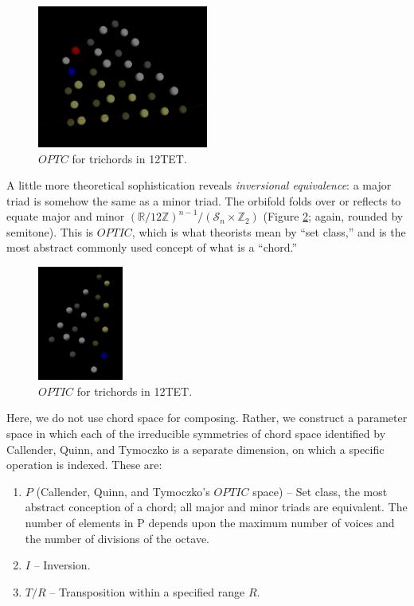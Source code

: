\documentclass[english,11pt,letterpaper,onecolumn]{scrartcl}
\numberwithin{equation}{section}
\begin{document}
\begin{figure}
\centerline{\includegraphics[width = 0.5\textwidth]{opttc}}
\caption{\label{fig:opttc}
  $OPTC$ for trichords in 12TET.}
\end{figure}

A little more theoretical sophistication reveals \textit{inversional
equivalence}: a major triad is somehow the same as a minor triad. The orbifold
folds over or reflects to equate major and minor
$\left(\mathbb{R}/12\mathbb{Z}\right)^{n-1}/(\mathcal{S}_{n} \times
\mathbb{Z}_{2})$ (Figure \ref{fig:optic}; again, rounded by semitone). This is
$OPTIC$, which is what theorists mean by ``set class,'' and is the most abstract
commonly used concept of what is a ``chord.''

\begin{figure}
\centerline{\includegraphics[width = 0.25\textwidth]{opttic}}
\caption{\label{fig:optic}
  $OPTIC$ for trichords in 12TET.}
\end{figure}

Here, we do not use chord space for composing. Rather, we construct a parameter
space in which each of the irreducible symmetries of chord space identified by
Callender, Quinn, and Tymoczko is a separate dimension, on which a specific
operation is indexed. These are:

\begin{enumerate}
\item $P$ (Callender, Quinn, and Tymoczko's $OPTIC$ space) -- Set class, the
most abstract conception of a chord; all major and minor triads are equivalent.
The number of elements in P depends upon the maximum number of voices and the
number of divisions of the octave.
\item $I$ -- Inversion.
\item $T/R$ -- Transposition within a specified range $R$.
\end{enumerate}
\end{document}
